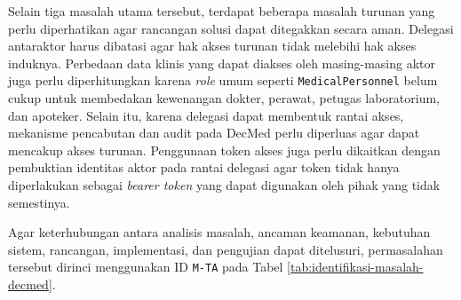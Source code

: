 \documentclass[bahasa, 12pt, a4paper, onecolumn, oneside, final]{report}
\begin{document}
Selain tiga masalah utama tersebut, terdapat beberapa masalah turunan yang perlu diperhatikan agar rancangan solusi dapat ditegakkan secara aman. Delegasi antaraktor harus dibatasi agar hak akses turunan tidak melebihi hak akses induknya. Perbedaan data klinis yang dapat diakses oleh masing-masing aktor juga perlu diperhitungkan karena \textit{role} umum seperti \texttt{MedicalPersonnel} belum cukup untuk membedakan kewenangan dokter, perawat, petugas laboratorium, dan apoteker. Selain itu, karena delegasi dapat membentuk rantai akses, mekanisme pencabutan dan audit pada DecMed perlu diperluas agar dapat mencakup akses turunan. Penggunaan token akses juga perlu dikaitkan dengan pembuktian identitas aktor pada rantai delegasi agar token tidak hanya diperlakukan sebagai \textit{bearer token} yang dapat digunakan oleh pihak yang tidak semestinya.

Agar keterhubungan antara analisis masalah, ancaman keamanan, kebutuhan sistem, rancangan, implementasi, dan pengujian dapat ditelusuri, permasalahan tersebut dirinci menggunakan ID \texttt{M-TA} pada Tabel \ref{tab:identifikasi-masalah-decmed}.
\end{document}

